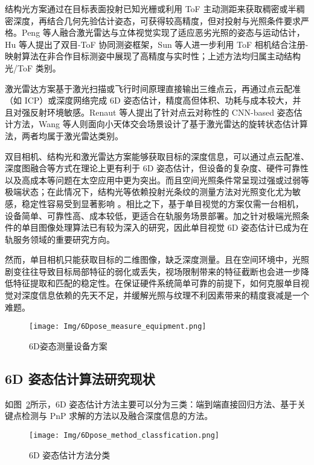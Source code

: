 结构光方案通过在目标表面投射已知光栅或利用 ToF 主动测距来获取稠密或半稠密深度，再结合几何先验估计姿态，可获得较高精度，但对投射与光照条件要求严格。Peng 等人融合激光雷达与立体视觉实现了适应恶劣光照的姿态与运动估计\cite{laser_stereo}，Hu 等人提出了双目-ToF 协同测姿框架\cite{hu2023non}，Sun 等人进一步利用 ToF 相机结合注册-映射算法在非合作目标测姿中展现了高精度与实时性\cite{sun2022relative}；上述方法均归属主动结构光/ToF 类别。

激光雷达方案基于激光扫描或飞行时间原理直接输出三维点云，再通过点云配准（如 ICP）或深度网络完成 6D 姿态估计，精度高但体积、功耗与成本较大，并且对强反射环境敏感。Renaut 等人提出了针对点云对称性的 CNN-based 姿态估计方法\cite{10801205}，Wang 等人则面向小天体交会场景设计了基于激光雷达的旋转状态估计算法\cite{10823741}，两者均属于激光雷达类别。


双目相机、结构光和激光雷达方案能够获取目标的深度信息，可以通过点云配准、深度图融合等方式在理论上更有利于 6D 姿态估计，但设备的复杂度、硬件可靠性以及高成本等问题在太空应用中更为突出。而且空间光照条件常呈现过强或过弱等极端状态；在此情况下，结构光等依赖投射光条纹的测量方法对光照变化尤为敏感，稳定性容易受到显著影响 \cite{tian2023all}。相比之下，基于单目视觉的方案仅需一台相机，设备简单、可靠性高、成本较低，更适合在轨服务场景部署。加之针对极端光照条件的单目图像处理算法已有较为深入的研究，因此单目视觉 6D 姿态估计已成为在轨服务领域的重要研究方向。

然而，单目相机只能获取目标的二维图像，缺乏深度测量。且在空间环境中，光照剧变往往导致目标局部特征的弱化或丢失，视场限制带来的特征截断也会进一步降低特征提取和匹配的稳定性\cite{Hu_2021_CVPR,wang2022revisiting,peng2019pvnet}。在保证硬件系统简单可靠的前提下，如何克服单目视觉对深度信息依赖的先天不足，并缓解光照与纹理不利因素带来的精度衰减是一个难题。

\begin{figure}[htbp]
	\centering
	\texttt{[image: Img/6Dpose\_measure\_equipment.png]}
	\caption{6D姿态测量设备方案}
	\label{fig:6D_equip}
\end{figure}


\subsection{6D 姿态估计算法研究现状}
如图~\ref{fig:6D_pose_method}所示，6D 姿态估计方法主要可以分为三类：端到端直接回归方法、基于关键点检测与 PnP 求解的方法以及融合深度信息的方法。

\begin{figure}[htbp]
	\centering
	\texttt{[image: Img/6Dpose\_method\_classfication.png]}
	\caption{6D 姿态估计方法分类}
	\label{fig:6D_pose_method}
\end{figure}

